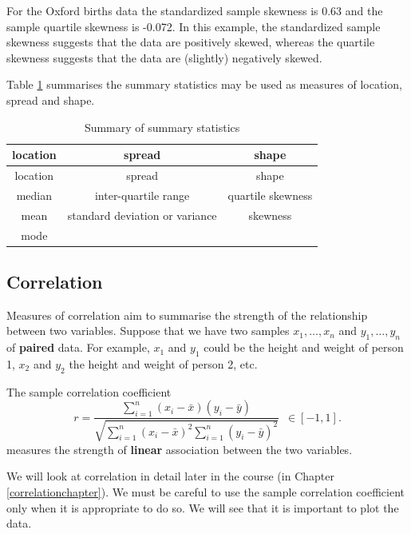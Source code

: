 \documentclass[
  british,
  11pt,
  openany, a4paper]{book}
\begin{document}
For the Oxford births data the standardized sample skewness is 0.63 and the sample quartile skewness is -0.072. In this example, the standardized sample skewness suggests that the data are positively skewed, whereas the quartile skewness suggests that the data are (slightly) negatively skewed.

Table \ref{tab:sumstats} summarises the summary statistics may be used as measures of location, spread and shape.

\begin{longtable}[]{@{}ccc@{}}
\caption{\label{tab:sumstats} Summary of summary statistics}\tabularnewline
\toprule\noalign{}
location & spread & shape \\
\midrule\noalign{}
\endfirsthead
\toprule\noalign{}
location & spread & shape \\
\midrule\noalign{}
\endhead
\bottomrule\noalign{}
\endlastfoot
median & inter-quartile range & quartile skewness \\
mean & standard deviation or variance & skewness \\
mode & & \\
\end{longtable}

\subsection{Correlation}\label{corr1}

Measures of correlation aim to summarise the strength of the relationship between two variables. Suppose that we have two samples \(x_1,\ldots,x_n\) and \(y_1,\ldots,y_n\) of \textbf{paired} data. For example, \(x_1\) and \(y_1\) could be the height and weight of person 1, \(x_2\) and \(y_2\) the height and weight of person 2, etc.

The sample correlation coefficient
\begin{equation}
r = \frac{\displaystyle\sum_{i=1}^n (x_i-\bar{x})(y_i-
\bar{y})}{\sqrt{\displaystyle\sum_{i=1}^n (x_i-\bar{x})^2 \displaystyle\sum_{i=1}^n(y_i-
\bar{y})^2}} \,\,\, \in [-1, 1]. 
\label{eq:corr}
\end{equation}
measures the strength of \textbf{linear} association between the two variables.

We will look at correlation in detail later in the course (in Chapter \ref{correlationchapter}). We must be careful to use the sample correlation coefficient only when it is appropriate to do so. We will see that it is important to plot the data.
\end{document}
